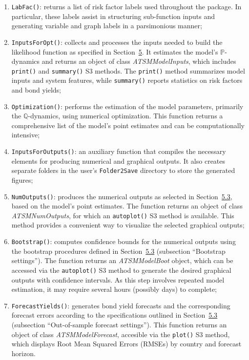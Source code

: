 \begin{enumerate}
\def\labelenumi{\arabic{enumi}.}
\item
  \texttt{LabFac()}: returns a list of risk factor labels used throughout the package. In particular, these labels assist in structuring sub-function inputs and generating variable and graph labels in a parsimonious manner;
\item
  \texttt{InputsForOpt()}: collects and processes the inputs needed to build the likelihood function as specified in Section~\hyperref[S:SectionInputs]{5}. It estimates the model's \(\mathbb{P}\)-dynamics and returns an object of class \emph{ATSMModelInputs}, which includes \texttt{print()} and \texttt{summary()} S3 methods. The \texttt{print()} method summarizes model inputs and system features, while \texttt{summary()} reports statistics on risk factors and bond yields;
\item
  \texttt{Optimization()}: performs the estimation of the model parameters, primarily the \(\mathbb{Q}\)-dynamics, using numerical optimization. This function returns a comprehensive list of the model's point estimates and can be computationally intensive;
\item
  \texttt{InputsForOutputs()}: an auxiliary function that compiles the necessary elements for producing numerical and graphical outputs. It also creates separate folders in the user's \texttt{Folder2Save} directory to store the generated figures;
\item
  \texttt{NumOutputs()}: produces the numerical outputs as selected in Section~\hyperref[S:SectionNumOut]{5.3}, based on the model's point estimates. The function returns an object of class \emph{ATSMNumOutputs}, for which an \texttt{autoplot()} S3 method is available. This method provides a convenient way to visualize the selected graphical outputs;
\item
  \texttt{Bootstrap()}: computes confidence bounds for the numerical outputs using the bootstrap procedures defined in Section~\hyperref[S:SectionNumOut]{5.3} (subsection ``Bootstrap settings''). The function returns an \emph{ATSMModelBoot} object, which can be accessed via the \texttt{autoplot()} S3 method to generate the desired graphical outputs with confidence intervals. As this step involves repeated model estimation, it may require several hours (possibly days) to complete;
\item
  \texttt{ForecastYields()}: generates bond yield forecasts and the corresponding forecast errors according to the specifications outlined in Section~\hyperref[S:SectionNumOut]{5.3} (subsection ``Out-of-sample forecast settings''). This function returns an object of class \emph{ATSMModelForecast}, accesible via the \texttt{plot()} S3 method, which displays Root Mean Squared Errors (RMSEs) by country and forecast horizon.
\end{enumerate}

